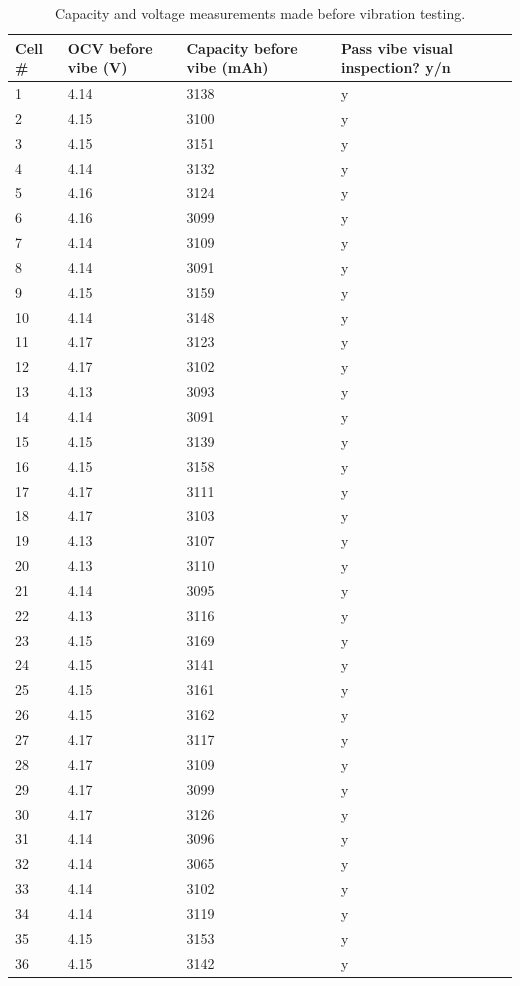 \documentclass{article}
\begin{document}
\begin{table}[H]
    \centering
    \caption{Capacity and voltage measurements made before vibration testing.}
    \begin{tabular}{llll}
        \textbf{Cell \#} & \textbf{OCV before vibe (V)} & \textbf{Capacity before vibe (mAh)} & \textbf{Pass vibe visual inspection? y/n} \\ \hline
        1 & 4.14 & 3138 & y \\ 
        2 & 4.15 & 3100 & y \\ 
        3 & 4.15 & 3151 & y \\ 
        4 & 4.14 & 3132 & y \\ 
        5 & 4.16 & 3124 & y \\ 
        6 & 4.16 & 3099 & y \\ 
        7 & 4.14 & 3109 & y \\ 
        8 & 4.14 & 3091 & y \\ 
        9 & 4.15 & 3159 & y \\ 
        10 & 4.14 & 3148 & y \\ 
        11 & 4.17 & 3123 & y \\ 
        12 & 4.17 & 3102 & y \\ 
        13 & 4.13 & 3093 & y \\ 
        14 & 4.14 & 3091 & y \\ 
        15 & 4.15 & 3139 & y \\ 
        16 & 4.15 & 3158 & y \\ 
        17 & 4.17 & 3111 & y \\ 
        18 & 4.17 & 3103 & y \\ 
        19 & 4.13 & 3107 & y \\ 
        20 & 4.13 & 3110 & y \\ 
        21 & 4.14 & 3095 & y \\ 
        22 & 4.13 & 3116 & y \\ 
        23 & 4.15 & 3169 & y \\ 
        24 & 4.15 & 3141 & y \\ 
        25 & 4.15 & 3161 & y \\ 
        26 & 4.15 & 3162 & y \\ 
        27 & 4.17 & 3117 & y \\ 
        28 & 4.17 & 3109 & y \\ 
        29 & 4.17 & 3099 & y \\ 
        30 & 4.17 & 3126 & y \\ 
        31 & 4.14 & 3096 & y \\ 
        32 & 4.14 & 3065 & y \\ 
        33 & 4.14 & 3102 & y \\ 
        34 & 4.14 & 3119 & y \\ 
        35 & 4.15 & 3153 & y \\ 
        36 & 4.15 & 3142 & y \\ 
    \end{tabular}
    \label{tab:acc1}
\end{table}
\end{document}
